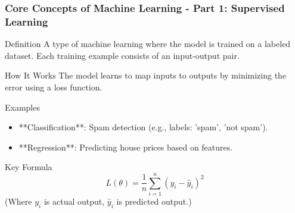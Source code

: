 \documentclass{beamer}
\begin{document}
\begin{frame}[fragile]
    \frametitle{Core Concepts of Machine Learning - Part 1: Supervised Learning}
    \begin{block}{Definition}
        A type of machine learning where the model is trained on a labeled dataset. Each training example consists of an input-output pair.
    \end{block}

    \begin{block}{How It Works}
        The model learns to map inputs to outputs by minimizing the error using a loss function.
    \end{block}

    \begin{block}{Examples}
        \begin{itemize}
            \item **Classification**: Spam detection (e.g., labels: 'spam', 'not spam').
            \item **Regression**: Predicting house prices based on features.
        \end{itemize}
    \end{block}

    \begin{block}{Key Formula}
        \begin{equation}
        L(\theta) = \frac{1}{n} \sum_{i=1}^{n} (y_i - \hat{y}_i)^2
        \end{equation}
        (Where \( y_i \) is actual output, \( \hat{y}_i \) is predicted output.)
    \end{block}
\end{frame}
\end{document}
